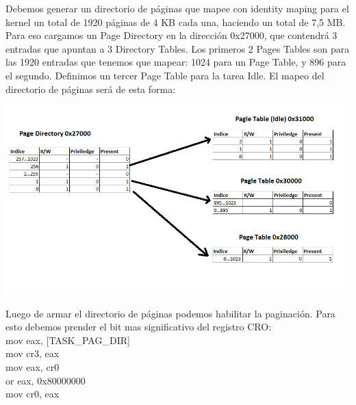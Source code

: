 Debemos generar un directorio de p\'aginas que mapee con identity maping para el kernel un total de 1920 p\'aginas de 4 KB cada una, haciendo un total de 7,5 MB.
Para eso cargamos un Page Directory en la direcci\'on 0x27000, que contendr\'a 3 entradas que apuntan a 3 Directory Tables. Los primeros 2 Pages Tables son para las 1920 entradas que tenemos que mapear: 1024 para un Page Table, y 896 para el segundo.
Definimos un tercer Page Table para la tarea Idle.
El mapeo del directorio de p\'aginas ser\'a de esta forma:

\includegraphics[scale=0.6]{imagenes/identity_mapping_kernel.png}


Luego de armar el directorio de p\'aginas podemos habilitar la paginaci\'on. Para esto debemos prender el bit mas significativo del registro CRO:\\
mov eax, [TASK\_PAG\_DIR]\\
mov cr3, eax\\
mov eax, cr0\\
or eax, 0x80000000\\
mov cr0, eax\\
